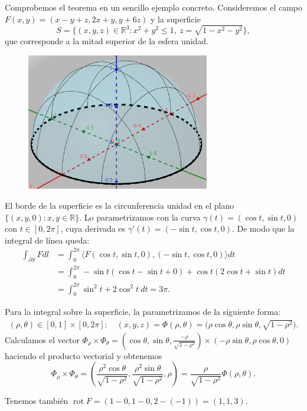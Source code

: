 \documentclass[12pt,spanish]{article}
\theoremstyle{definition}
\theoremstyle{remark}
\begin{document}
Comprobemos el teorema en un sencillo ejemplo concreto. Consideremos el campo $F(x,y)=(x-y+z,2x+y,y+6z)$ y la superficie \[S=\big\{(x,y,z)\in\mathbb{R}^3: x^2+y^2\leq 1, \  z=\sqrt{1-x^2-y^2}\big\},\]
que corresponde a la mitad superior de la esfera unidad.

\begin{figure}[H]
	\centering
	\includegraphics[width=80mm]{images/superficie-ejemplo-stokes}
\end{figure}

El borde de la superficie es la circunferencia unidad en el plano $\{(x,y,0):x,y\in\mathbb{R}\}$. Lo parametrizamos con la curva $\gamma(t)=(\cos t,\sin t, 0)$ con $t\in[0,2\pi]$, cuya derivada es $\gamma'(t)=(-\sin t, \cos t, 0)$. De modo que la integral de línea queda:
\begin{align*}
\int_{\partial S} F dl&=\int_0^{2\pi}\langle F(\cos t,\sin t, 0),(-\sin t, \cos t, 0) \rangle dt \\ 
&=\int_0^{2\pi} -\sin t (\cos t-\sin t+0)+\cos t (2\cos t+\sin t)dt \\
&=\int_0^{2\pi} \sin^2 t + 2\cos^2t \ dt = 3\pi.
\end{align*}

Para la integral sobre la superficie, la parametrizamos de la siguiente forma:
\begin{gather*}
(\rho,\theta)\in[0,1]\times[0,2\pi];\quad (x,y,z)=\Phi(\rho,\theta)=\big(\rho\cos \theta, \rho\sin\theta, \sqrt{1-\rho^2}\big).
\end{gather*}
Calculamos el vector $\Phi_\rho\times \Phi_\theta=\left(\cos\theta,\sin\theta,\frac{-\rho}{\sqrt{1-\rho^2}}\right)\times (-\rho\sin\theta,\rho\cos\theta,0)$ haciendo el producto vectorial y obtenemos
\[\Phi_\rho\times \Phi_\theta=\left(\frac{\rho^2\cos\theta}{\sqrt{1-\rho^2}},\frac{\rho^2\sin\theta}{\sqrt{1-\rho^2}},\rho\right)=\frac{\rho}{\sqrt{1-\rho^2}}\Phi(\rho,\theta).\]

Tenemos también $\operatorname{rot} F=(1-0,1-0,2-(-1))=(1,1,3)$.
\end{document}
